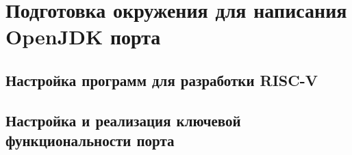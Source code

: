 \section{Подготовка окружения для написания OpenJDK порта}

\subsection{Настройка программ для разработки RISC-V}

\subsection{Настройка и реализация ключевой функциональности порта}
